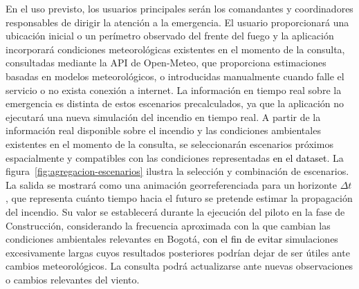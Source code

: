 En el uso previsto, los usuarios principales serán los comandantes y coordinadores responsables de dirigir la atención a la emergencia. El usuario proporcionará una ubicación inicial o un perímetro observado del frente del fuego y la aplicación incorporará condiciones meteorológicas existentes en el momento de la consulta, consultadas mediante la API de Open-Meteo, que proporciona estimaciones basadas en modelos meteorológicos, o introducidas manualmente cuando falle el servicio o no exista conexión a internet. La información en tiempo real sobre la emergencia es distinta de estos escenarios precalculados, ya que la aplicación no ejecutará una nueva simulación del incendio en tiempo real. A partir de la información real disponible sobre el incendio y las condiciones ambientales existentes en el momento de la consulta, se seleccionarán escenarios próximos espacialmente y compatibles con las condiciones representadas \textcolor{black}{en el dataset}. La figura~\ref{fig:agregacion-escenarios} ilustra la selección y combinación de escenarios. La salida se mostrará como una animación georreferenciada para un horizonte $\Delta t$, que representa cuánto tiempo hacia el futuro se pretende estimar la propagación del incendio. Su valor se establecerá durante la ejecución del piloto en la fase de Construcción, considerando la frecuencia aproximada con la que cambian las condiciones ambientales relevantes en Bogotá, \textcolor{black}{con el fin de evitar} simulaciones excesivamente largas cuyos resultados posteriores podrían dejar de ser útiles ante cambios meteorológicos. La consulta podrá actualizarse ante nuevas observaciones o cambios relevantes del viento.\begin{figure}[H]
\centering
\setlength{\unitlength}{1pt}
\end{figure}
